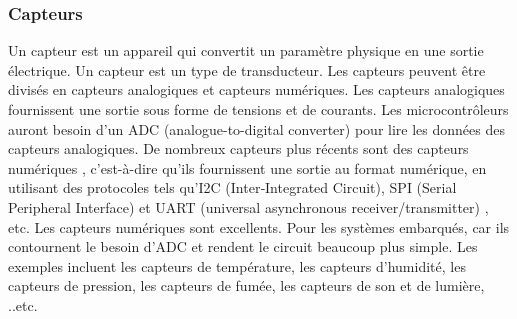 \subsubsection{Capteurs}
Un capteur est un appareil qui convertit un paramètre physique en une sortie électrique. Un capteur est un type de transducteur. Les capteurs peuvent être divisés en capteurs analogiques et capteurs numériques. Les capteurs analogiques fournissent une sortie sous forme de tensions et de courants. Les microcontrôleurs auront besoin d'un ADC (analogue-to-digital converter) \cite{hoeschele1994analog} pour lire les données des capteurs analogiques. De nombreux capteurs plus récents sont des capteurs numériques \cite{kaltenbacher2007numerical}, c'est-à-dire qu'ils fournissent une sortie au format numérique, en utilisant des protocoles tels qu’I2C (Inter‐Integrated Circuit), SPI (Serial Peripheral Interface) \cite{marinkovic2011nano} et UART (universal asynchronous receiver/transmitter) \cite{chun2011universal}, etc. Les capteurs numériques sont excellents. Pour les systèmes embarqués, car ils contournent le besoin d'ADC et rendent le circuit beaucoup plus simple. Les exemples incluent les capteurs de température, les capteurs d'humidité, les capteurs de pression, les capteurs de fumée, les capteurs de son et de lumière, ..etc.



